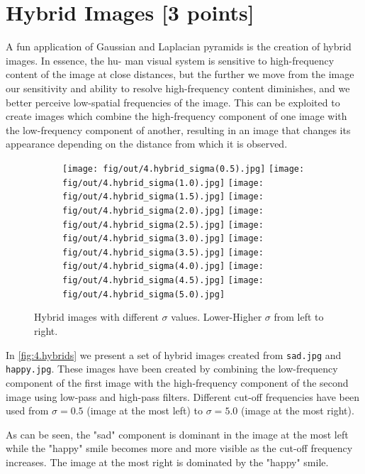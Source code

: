 \documentclass[tikz,14pt,fleqn]{article}
\begin{document}
\section{Hybrid Images [3 points]}

A fun application of Gaussian and Laplacian pyramids is the creation of hybrid images. In essence, the hu-
man visual system is sensitive to high-frequency content of the image at close distances, but the further we move from the image our sensitivity and ability to resolve high-frequency content diminishes, and we better perceive low-spatial frequencies of the image. This can be exploited to create images which combine the high-frequency component of one image with the low-frequency component of another, resulting in an image that changes its appearance depending on the distance from which it is observed.

\begin{figure}[H]
    \centering
    \begin{subfigure}[]{\linewidth}
        \texttt{[image: fig/out/4.hybrid\_sigma(0.5).jpg]}
        \texttt{[image: fig/out/4.hybrid\_sigma(1.0).jpg]}
        \texttt{[image: fig/out/4.hybrid\_sigma(1.5).jpg]}
        \texttt{[image: fig/out/4.hybrid\_sigma(2.0).jpg]}
        \texttt{[image: fig/out/4.hybrid\_sigma(2.5).jpg]}
        \texttt{[image: fig/out/4.hybrid\_sigma(3.0).jpg]}
        \texttt{[image: fig/out/4.hybrid\_sigma(3.5).jpg]}
        \texttt{[image: fig/out/4.hybrid\_sigma(4.0).jpg]}
        \texttt{[image: fig/out/4.hybrid\_sigma(4.5).jpg]}
        \texttt{[image: fig/out/4.hybrid\_sigma(5.0).jpg]}
    \end{subfigure}
    \caption{Hybrid images with different $\sigma$ values. Lower-Higher $\sigma$ from left to right.}
    \label{fig:4.hybrids}
\end{figure}

In \autoref{fig:4.hybrids} we present a set of hybrid images created from \texttt{sad.jpg} and \texttt{happy.jpg}. These images have been created by combining the low-frequency component of the first image with the high-frequency component of the second image using low-pass and high-pass filters. Different cut-off frequencies have been used from $\sigma=0.5$ (image at the most left) to $\sigma=5.0$ (image at the most right).

As can be seen, the "sad" component is dominant in the image at the most left while the "happy" smile becomes more and more visible as the cut-off frequency increases. The image at the most right is dominated by the "happy" smile.
\end{document}
